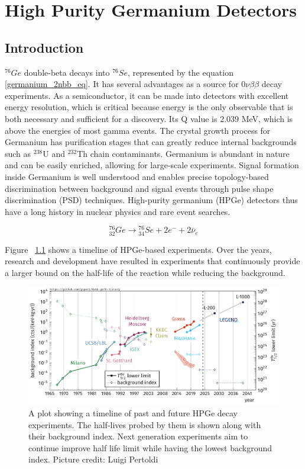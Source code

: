 \chapter{High Purity Germanium Detectors}
\label{chap:detectors}

\section{Introduction}
${}^{76}Ge$ double-beta decays into ${}^{76}Se$, represented by the equation \ref{germanium_2nbb_eq}. It has several advantages as a source for $0\nu\beta\beta$ decay experiments. As a semiconductor, it can be made into detectors with excellent energy resolution, which is critical because energy is the only observable that is both necessary and sufficient for a discovery. Its Q value is $2.039$ MeV, which is above the energies of most gamma events. The crystal growth process for Germanium has purification stages that can greatly reduce internal backgrounds such as $^{238}$U and $^{232}$Th chain contaminants. Germanium is abundant in nature and can be easily enriched, allowing for large-scale experiments. Signal formation inside Germanium is well understood and enables precise topology-based discrimination between background and signal events through pulse shape discrimination (PSD) techniques. High-purity germanium (HPGe) detectors thus have a long history in nuclear physics and rare event searches.


\begin{equation}\label{germanium_2nbb_eq}
{}_{32}^{76}Ge \rightarrow {}_{34}^{76}Se + 2e^- + 2\bar{\nu}_e
\end{equation}

Figure ~\ref{past_ge_exp} shows a timeline of HPGe-based experiments. Over the years, research and development have resulted in experiments that continuously provide a larger bound on the half-life of the reaction while reducing the background. 

\begin{figure}[!htb]
\centering
\includegraphics[trim=0.1cm 0 0.1cm 0,clip, width=0.99\linewidth]{ch2/figs/0nbb-ge76-history-future.pdf}
\caption{A plot showing a timeline of past and future HPGe {\onbb} decay experiments. The half-lives probed by them is shown along with their background index. Next generation experiments aim to continue improve half life limit while having the lowest background index. Picture credit: Luigi Pertoldi}
\label{past_ge_exp}
\end{figure}


